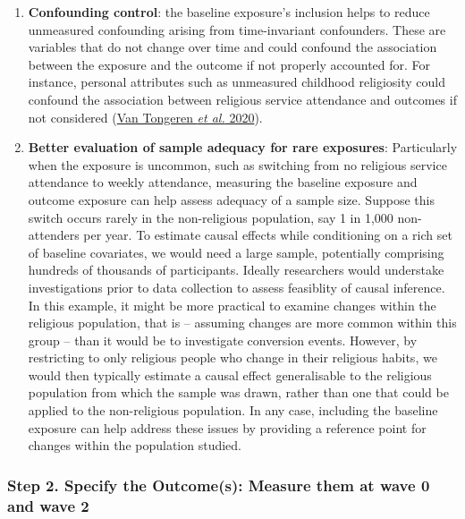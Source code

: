 \documentclass[
  singlecolumn]{article}
\begin{document}
\begin{enumerate}
\def\labelenumi{\arabic{enumi}.}
\setcounter{enumi}{1}
\item
  \textbf{Confounding control}: the baseline exposure's inclusion helps
  to reduce unmeasured confounding arising from time-invariant
  confounders. These are variables that do not change over time and
  could confound the association between the exposure and the outcome if
  not properly accounted for. For instance, personal attributes such as
  unmeasured childhood religiosity could confound the association
  between religious service attendance and outcomes if not considered
  (\protect\hyperlink{ref-vantongeren2020}{Van Tongeren \emph{et al.}
  2020}).
\item
  \textbf{Better evaluation of sample adequacy for rare exposures}:
  Particularly when the exposure is uncommon, such as switching from no
  religious service attendance to weekly attendance, measuring the
  baseline exposure and outcome exposure can help assess adequacy of a
  sample size. Suppose this switch occurs rarely in the non-religious
  population, say 1 in 1,000 non-attenders per year. To estimate causal
  effects while conditioning on a rich set of baseline covariates, we
  would need a large sample, potentially comprising hundreds of
  thousands of participants. Ideally researchers would understake
  investigations prior to data collection to assess feasiblity of causal
  inference. In this example, it might be more practical to examine
  changes within the religious population, that is -- assuming changes
  are more common within this group -- than it would be to investigate
  conversion events. However, by restricting to only religious people
  who change in their religious habits, we would then typically estimate
  a causal effect generalisable to the religious population from which
  the sample was drawn, rather than one that could be applied to the
  non-religious population. In any case, including the baseline exposure
  can help address these issues by providing a reference point for
  changes within the population studied.
\end{enumerate}

\hypertarget{step-2.-specify-the-outcomes-measure-them-at-wave-0-and-wave-2}{%
\subsubsection{Step 2. Specify the Outcome(s): Measure them at wave 0
and wave
2}\label{step-2.-specify-the-outcomes-measure-them-at-wave-0-and-wave-2}}
\end{document}

